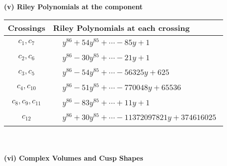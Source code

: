 \documentclass[1p]{elsarticle_modified}
\theoremstyle{definition}
\begin{document}
\newpage\renewcommand{\arraystretch}{1}
\flushleft \textbf{(v) Riley Polynomials at the component}\newline \\
\begin{tabular}{m{50pt}|m{274pt}}
Crossings & \hspace{64pt}Riley Polynomials at each crossing \\
\hline $$\begin{aligned}c_{1},c_{7}\end{aligned}$$&$\begin{aligned}
&y^{86}+54 y^{85}+\cdots-85 y+1
\end{aligned}$\\
\hline $$\begin{aligned}c_{2},c_{6}\end{aligned}$$&$\begin{aligned}
&y^{86}-30 y^{85}+\cdots-21 y+1
\end{aligned}$\\
\hline $$\begin{aligned}c_{3},c_{5}\end{aligned}$$&$\begin{aligned}
&y^{86}-54 y^{85}+\cdots-56325 y+625
\end{aligned}$\\
\hline $$\begin{aligned}c_{4},c_{10}\end{aligned}$$&$\begin{aligned}
&y^{86}-51 y^{85}+\cdots-770048 y+65536
\end{aligned}$\\
\hline $$\begin{aligned}c_{8},c_{9},c_{11}\end{aligned}$$&$\begin{aligned}
&y^{86}-83 y^{85}+\cdots+11 y+1
\end{aligned}$\\
\hline $$\begin{aligned}c_{12}\end{aligned}$$&$\begin{aligned}
&y^{86}+30 y^{85}+\cdots-11372097821 y+374616025
\end{aligned}$\\
\hline
\end{tabular}\\~\\
\newpage\flushleft \textbf{(vi) Complex Volumes and Cusp Shapes}
\end{document}
